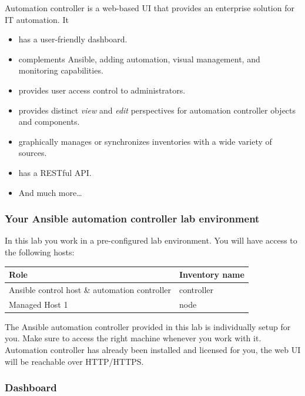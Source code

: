 Automation controller is a web-based UI that provides an enterprise
solution for IT automation. It

\begin{itemize}
\tightlist
\item
  has a user-friendly dashboard.
\item
  complements Ansible, adding automation, visual management, and
  monitoring capabilities.
\item
  provides user access control to administrators.
\item
  provides distinct \emph{view} and \emph{edit} perspectives for
  automation controller objects and components.
\item
  graphically manages or synchronizes inventories with a wide variety of
  sources.
\item
  has a RESTful API.
\item
  And much more\ldots{}
\end{itemize}

\hypertarget{your-ansible-automation-controller-lab-environment}{%
\subsubsection{Your Ansible automation controller lab
environment}\label{your-ansible-automation-controller-lab-environment}}

In this lab you work in a pre-configured lab environment. You will have
access to the following hosts:

\begin{longtable}[]{@{}ll@{}}
\toprule\noalign{}
Role & Inventory name \\
\midrule\noalign{}
\endhead
\bottomrule\noalign{}
\endlastfoot
Ansible control host \& automation controller & controller \\
Managed Host 1 & node \\
\end{longtable}

The Ansible automation controller provided in this lab is individually
setup for you. Make sure to access the right machine whenever you work
with it. Automation controller has already been installed and licensed
for you, the web UI will be reachable over HTTP/HTTPS.

\hypertarget{dashboard}{%
\subsubsection{Dashboard}\label{dashboard}}

